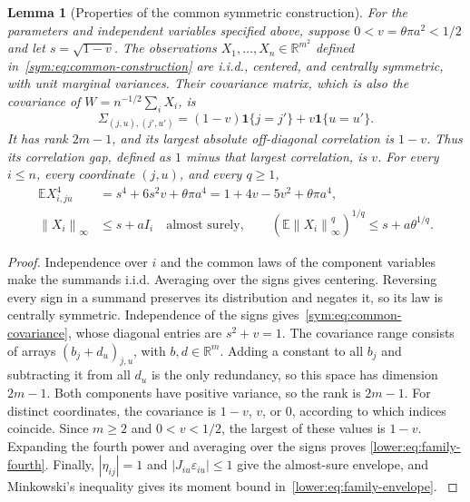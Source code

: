 \documentclass[11pt,letterpaper]{article}
\newenvironment{recovered}{}{}
\newtheorem{lemma}{Lemma}
\theoremstyle{remark}
\newcommand{\E}{\mathbb E}
\newcommand{\R}{\mathbb R}
\newcommand{\norm}[1]{\left\lVert#1\right\rVert}
\newcommand{\ind}{\mathbf 1}
\begin{document}
\begin{recovered}
\begin{lemma}[Properties of the common symmetric construction]
\label{lower:family-properties}
For the parameters and independent variables specified above, suppose
\(0<v=\theta\pi a^2<1/2\) and let \(s=\sqrt{1-v}\).
The observations \(X_1,\ldots,X_n\in\R^{m^2}\) defined
in~\eqref{sym:eq:common-construction} are i.i.d., centered, and
centrally symmetric, with unit marginal variances. Their covariance
matrix, which is also the covariance of \(W=n^{-1/2}\sum_iX_i\), is
\begin{equation}
 \Sigma_{(j,u),(j',u')}=(1-v)\ind\{j=j'\}+v\ind\{u=u'\}.
 \label{sym:eq:common-covariance}
\end{equation}
It has rank \(2m-1\), and its largest absolute off-diagonal
correlation is \(1-v\). Thus its \emph{correlation gap}, defined as
\(1\) minus that largest correlation, is \(v\).
For every \(i\le n\), every coordinate \((j,u)\), and every \(q\ge1\),
\begin{align}
 \E X_{i,ju}^4
 &=s^4+6s^2v+\theta\pi a^4
   =1+4v-5v^2+\theta\pi a^4,\label{lower:eq:family-fourth}\\
 \norm{X_i}_\infty&\le s+aI_i\quad\text{almost surely},\qquad
 (\E\norm{X_i}_\infty^q)^{1/q}\le s+a\theta^{1/q}.
 \label{lower:eq:family-envelope}
\end{align}
\end{lemma}
\end{recovered}

\begin{proof}
\begin{recovered}
Independence over \(i\) and the common laws of the component variables
make the summands i.i.d. Averaging over the signs gives centering.
Reversing every sign in a summand preserves its distribution and
negates it, so its law is centrally symmetric.
Independence of the signs gives~\eqref{sym:eq:common-covariance},
whose diagonal entries are \(s^2+v=1\).
\end{recovered}
The covariance range consists of
arrays \((b_j+d_u)_{j,u}\), with \(b,d\in\R^m\).
Adding a constant to all \(b_j\) and subtracting it from all \(d_u\)
is the only redundancy, so this space has dimension \(2m-1\).
Both components have positive variance, so the rank is \(2m-1\).
\begin{recovered}
For distinct coordinates, the covariance is \(1-v\), \(v\), or
\(0\), according to which indices coincide. Since \(m\ge2\) and
\(0<v<1/2\), the largest of these values is \(1-v\).
Expanding the fourth power and averaging over the signs proves
\eqref{lower:eq:family-fourth}. Finally, \(|\eta_{ij}|=1\) and
\(|J_{iu}\varepsilon_{iu}|\le1\) give the almost-sure envelope,
and Minkowski's inequality gives its moment bound
in~\eqref{lower:eq:family-envelope}.
\end{recovered}
\end{proof}
\end{document}

